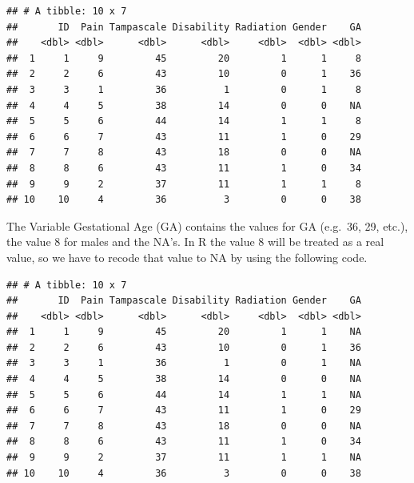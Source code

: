 \documentclass[]{book}
\newenvironment{Shaded}{\begin{snugshade}}{\end{snugshade}}
\newcommand{\KeywordTok}[1]{\textcolor[rgb]{0.13,0.29,0.53}{\textbf{#1}}}
\newcommand{\DecValTok}[1]{\textcolor[rgb]{0.00,0.00,0.81}{#1}}
\newcommand{\StringTok}[1]{\textcolor[rgb]{0.31,0.60,0.02}{#1}}
\newcommand{\OtherTok}[1]{\textcolor[rgb]{0.56,0.35,0.01}{#1}}
\newcommand{\OperatorTok}[1]{\textcolor[rgb]{0.81,0.36,0.00}{\textbf{#1}}}
\newcommand{\NormalTok}[1]{#1}
\begin{document}
\begin{verbatim}
## # A tibble: 10 x 7
##       ID  Pain Tampascale Disability Radiation Gender    GA
##    <dbl> <dbl>      <dbl>      <dbl>     <dbl>  <dbl> <dbl>
##  1     1     9         45         20         1      1     8
##  2     2     6         43         10         0      1    36
##  3     3     1         36          1         0      1     8
##  4     4     5         38         14         0      0    NA
##  5     5     6         44         14         1      1     8
##  6     6     7         43         11         1      0    29
##  7     7     8         43         18         0      0    NA
##  8     8     6         43         11         1      0    34
##  9     9     2         37         11         1      1     8
## 10    10     4         36          3         0      0    38
\end{verbatim}

The Variable Gestational Age (GA) contains the values for GA (e.g.~36,
29, etc.), the value 8 for males and the NA's. In R the value 8 will be
treated as a real value, so we have to recode that value to NA by using
the following code.

\begin{Shaded}
\end{Shaded}

\begin{verbatim}
## # A tibble: 10 x 7
##       ID  Pain Tampascale Disability Radiation Gender    GA
##    <dbl> <dbl>      <dbl>      <dbl>     <dbl>  <dbl> <dbl>
##  1     1     9         45         20         1      1    NA
##  2     2     6         43         10         0      1    36
##  3     3     1         36          1         0      1    NA
##  4     4     5         38         14         0      0    NA
##  5     5     6         44         14         1      1    NA
##  6     6     7         43         11         1      0    29
##  7     7     8         43         18         0      0    NA
##  8     8     6         43         11         1      0    34
##  9     9     2         37         11         1      1    NA
## 10    10     4         36          3         0      0    38
\end{verbatim}
\end{document}
